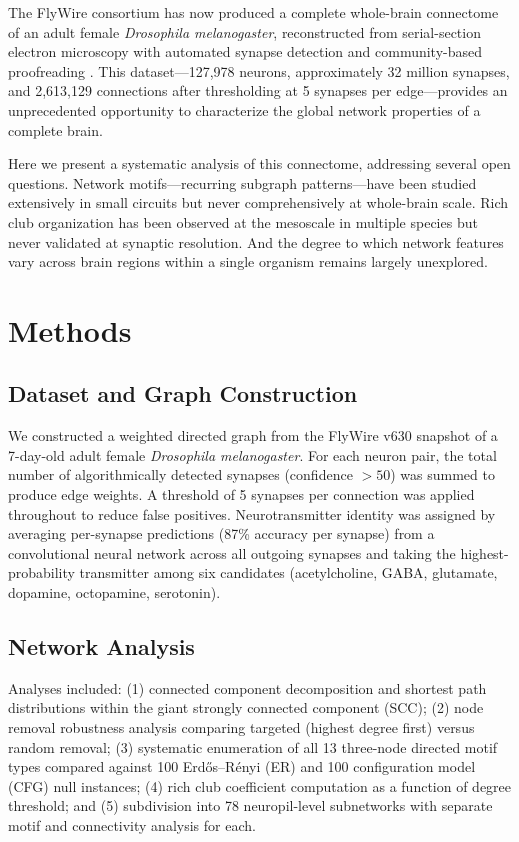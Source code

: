 \documentclass[11pt]{article}
\begin{document}
The FlyWire consortium has now produced a complete whole-brain connectome of an adult female \textit{Drosophila melanogaster}, reconstructed from serial-section electron microscopy with automated synapse detection and community-based proofreading \citep{dorkenwald2024flywire}. This dataset---127,978 neurons, approximately 32 million synapses, and 2,613,129 connections after thresholding at 5 synapses per edge---provides an unprecedented opportunity to characterize the global network properties of a complete brain.

Here we present a systematic analysis of this connectome, addressing several open questions. Network motifs---recurring subgraph patterns---have been studied extensively in small circuits \citep{milo2002network} but never comprehensively at whole-brain scale. Rich club organization has been observed at the mesoscale in multiple species \citep{vandenHeuvel2011rich} but never validated at synaptic resolution. And the degree to which network features vary across brain regions within a single organism remains largely unexplored.

\section{Methods}

\subsection{Dataset and Graph Construction}

We constructed a weighted directed graph from the FlyWire v630 snapshot of a 7-day-old adult female \textit{Drosophila melanogaster}. For each neuron pair, the total number of algorithmically detected synapses (confidence $> 50$) was summed to produce edge weights. A threshold of 5 synapses per connection was applied throughout to reduce false positives. Neurotransmitter identity was assigned by averaging per-synapse predictions (87\% accuracy per synapse) from a convolutional neural network \citep{eckstein2024neurotransmitter} across all outgoing synapses and taking the highest-probability transmitter among six candidates (acetylcholine, GABA, glutamate, dopamine, octopamine, serotonin).

\subsection{Network Analysis}

Analyses included: (1) connected component decomposition and shortest path distributions within the giant strongly connected component (SCC); (2) node removal robustness analysis comparing targeted (highest degree first) versus random removal; (3) systematic enumeration of all 13 three-node directed motif types compared against 100 Erd\H{o}s--R\'{e}nyi (ER) \citep{erdos1959random} and 100 configuration model (CFG) null instances; (4) rich club coefficient computation as a function of degree threshold; and (5) subdivision into 78 neuropil-level subnetworks with separate motif and connectivity analysis for each.
\end{document}
